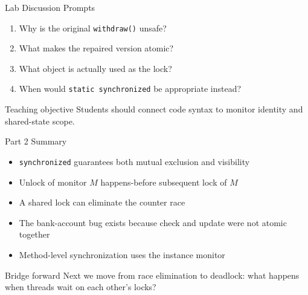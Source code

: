 \documentclass[aspectratio=169,11pt]{beamer}
\begin{document}
	\begin{frame}{Lab Discussion Prompts}
		\begin{enumerate}
			\item Why is the original \texttt{withdraw()} unsafe?
			\item What makes the repaired version atomic?
			\item What object is actually used as the lock?
			\item When would \texttt{static synchronized} be appropriate instead?
		\end{enumerate}
		
		\bigskip
		
		\begin{alertblock}{Teaching objective}
			Students should connect code syntax to monitor identity and shared-state scope.
		\end{alertblock}
	\end{frame}
	
	\begin{frame}{Part 2 Summary}
		\begin{itemize}
			\item \texttt{synchronized} guarantees both mutual exclusion and visibility
			\item Unlock of monitor \(M\) happens-before subsequent lock of \(M\)
			\item A shared lock can eliminate the counter race
			\item The bank-account bug exists because check and update were not atomic together
			\item Method-level synchronization uses the instance monitor
		\end{itemize}
		
		\bigskip
		
		\begin{alertblock}{Bridge forward}
			Next we move from race elimination to deadlock:
			what happens when threads wait on each other’s locks?
		\end{alertblock}
	\end{frame}
	
\end{document}
